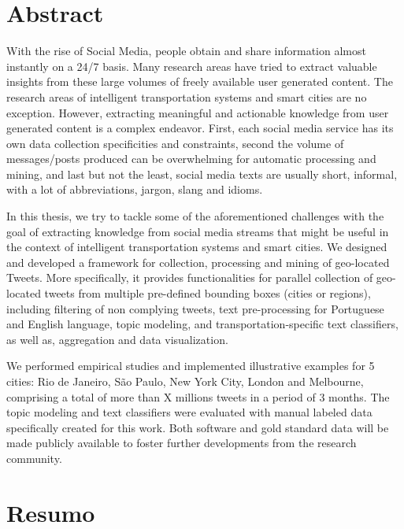 \chapter*{Abstract}

With the rise of Social Media, people obtain and share information almost instantly on a 24/7 basis. Many research areas have tried to extract valuable insights from these large volumes of freely available user generated content. The research areas of intelligent transportation systems and smart cities are no exception. However, extracting meaningful and actionable knowledge from user generated content is a complex endeavor. First, each social media service has its own data collection specificities and constraints, second the volume of messages/posts produced can be overwhelming for automatic processing and mining, and last but not the least, social media texts are usually short, informal, with a lot of abbreviations, jargon, slang and idioms.
 
In this thesis, we try to tackle some of the aforementioned challenges with the goal of extracting knowledge from social media streams that might be useful in the context of intelligent transportation systems and smart cities. We designed and developed a framework for collection, processing and mining of geo-located Tweets. More specifically, it provides functionalities for parallel collection of geo-located tweets from multiple pre-defined bounding boxes (cities or regions), including filtering of non complying tweets, text pre-processing for Portuguese and English language, topic modeling, and transportation-specific text classifiers, as well as, aggregation and data visualization.
 
We performed empirical studies and implemented illustrative examples for 5 cities: Rio de Janeiro, São Paulo, New York City, London and Melbourne, comprising a total of more than X millions tweets in a period of 3 months. The topic modeling and text classifiers were evaluated with manual labeled data specifically created for this work. Both software and gold standard data will be made publicly available to foster further developments from the research community.


\chapter*{Resumo}

